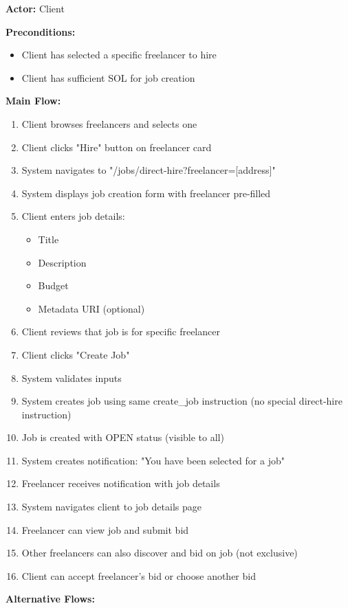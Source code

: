 \documentclass[a4paper,13pt,twoside]{report}
\theoremstyle{definition}
\begin{document}
\textbf{Actor:} Client

\textbf{Preconditions:}
\begin{itemize}
    \item Client has selected a specific freelancer to hire
    \item Client has sufficient SOL for job creation
\end{itemize}

\textbf{Main Flow:}
\begin{enumerate}
    \item Client browses freelancers and selects one
    \item Client clicks "Hire" button on freelancer card
    \item System navigates to "/jobs/direct-hire?freelancer=[address]"
    \item System displays job creation form with freelancer pre-filled
    \item Client enters job details:
    \begin{itemize}
        \item Title
        \item Description
        \item Budget
        \item Metadata URI (optional)
    \end{itemize}
    \item Client reviews that job is for specific freelancer
    \item Client clicks "Create Job"
    \item System validates inputs
    \item System creates job using same create\_job instruction (no special direct-hire instruction)
    \item Job is created with OPEN status (visible to all)
    \item System creates notification: "You have been selected for a job"
    \item Freelancer receives notification with job details
    \item System navigates client to job details page
    \item Freelancer can view job and submit bid
    \item Other freelancers can also discover and bid on job (not exclusive)
    \item Client can accept freelancer's bid or choose another bid
\end{enumerate}

\textbf{Alternative Flows:}
\end{document}
